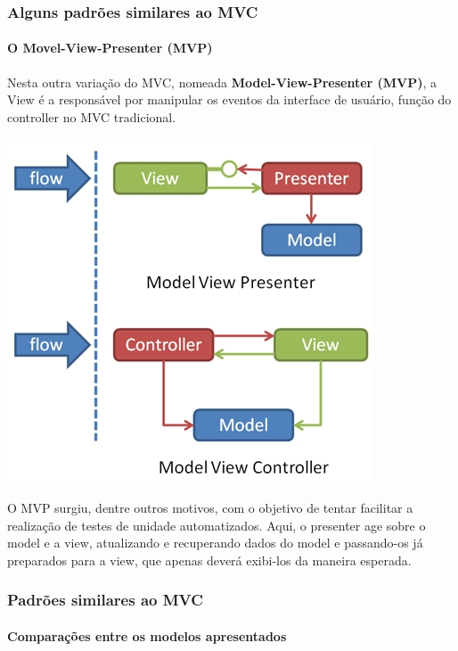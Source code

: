 \documentclass{beamer}
\begin{document}
\begin{frame}
\frametitle{Alguns padrões similares ao MVC}
\framesubtitle{O Movel-View-Presenter (MVP)}
	Nesta outra variação do MVC, nomeada \textbf{Model-View-Presenter (MVP)}, a View é a responsável por manipular os eventos da interface de usuário, função do controller no MVC tradicional.
	\begin{center}
		\includegraphics[scale=0.2]{MVP.jpg}
	\end{center}
	O MVP surgiu, dentre outros motivos, com o objetivo de tentar facilitar a realização de testes de unidade automatizados. Aqui, o presenter age sobre o model
	e a view, atualizando e recuperando dados do model e passando-os já preparados para a view, que apenas deverá exibi-los da maneira esperada.
\end{frame}

\begin{frame}
\frametitle{Padrões similares ao MVC}
\framesubtitle{Comparações entre os modelos apresentados}
\end{frame}
\end{document}
